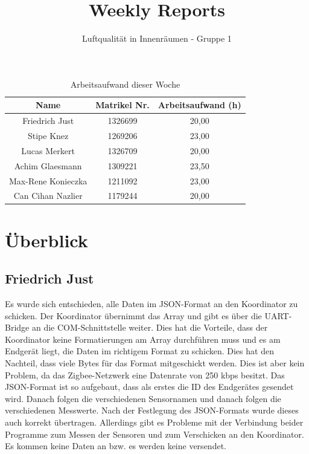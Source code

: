 \documentclass[]{article}
\title{Weekly Reports}
\author{Luftqualität in Innenräumen - Gruppe 1}
\begin{document}
\maketitle

\begin{table}[h!]
	\centering
	\begin{tabular}{|c|c|c|}
		\hline
		{\textbf{Name}}				&		{\textbf{Matrikel Nr.}} & {\textbf{Arbeitsaufwand (h)}} \\
		\hline
		Friedrich Just				&		1326699 				&	20,00	\\
		\hline
		Stipe Knez				&		1269206 				&	23,00	\\
		\hline
		Lucas Merkert				&		1326709					&	20,00	\\
		\hline
		Achim Glaesmann				&		1309221					&	23,50	\\
		\hline
		Max-Rene Konieczka			&		1211092					&	23,00	\\
		\hline
		Can Cihan Nazlier			&		1179244					&	20,00	\\
		\hline
	\end{tabular}
	\caption{Arbeitsaufwand dieser Woche}
	\label{tab:worakload}
\end{table}



\section{Überblick}


\subsection{Friedrich Just}
Es wurde sich entschieden, alle Daten im JSON-Format an den Koordinator zu schicken. Der Koordinator übernimmt das Array und gibt es über die UART-Bridge an die COM-Schnittstelle weiter. Dies hat die Vorteile, dass der Koordinator keine Formatierungen am Array durchführen muss und es am Endgerät liegt, die Daten im richtigem Format zu schicken. Dies hat den Nachteil, dass viele Bytes für das Format mitgeschickt werden. Dies ist aber kein Problem, da das Zigbee-Netzwerk eine Datenrate von 250 kbps besitzt. Das JSON-Format ist so aufgebaut, dass als erstes die ID des Endgerätes gesendet wird. Danach folgen die verschiedenen Sensornamen und danach folgen die verschiedenen Messwerte.
Nach der Festlegung des JSON-Formats wurde dieses auch korrekt übertragen. Allerdings gibt es Probleme mit der Verbindung beider Programme zum Messen der Sensoren und zum Verschicken an den Koordinator. Es kommen keine Daten an bzw. es werden keine versendet.
\end{document}
